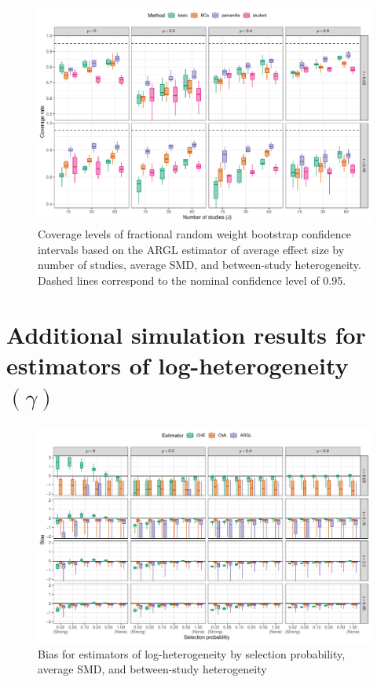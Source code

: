 \documentclass[
  american,
  man, donotrepeattitle,floatsintext]{apa7}
\begin{document}
\begin{figure}
\includegraphics{step-function-selection-models-with-dependent-effects_files/figure-latex/ARGL-coverage-exponential-1} \caption{Coverage levels of fractional random weight bootstrap confidence intervals based on the ARGL estimator of average effect size by number of studies, average SMD, and between-study heterogeneity. Dashed lines correspond to the nominal confidence level of 0.95.}\label{fig:ARGL-coverage-exponential}
\end{figure}

\section{\texorpdfstring{Additional simulation results for estimators of log-heterogeneity \((\gamma)\)}{Additional simulation results for estimators of log-heterogeneity (\textbackslash gamma)}}\label{gamma-simulation-results}

\begin{figure}
\includegraphics{step-function-selection-models-with-dependent-effects_files/figure-latex/heterogeneity-bias-1} \caption{Bias for estimators of log-heterogeneity by selection probability, average SMD, and between-study heterogeneity}\label{fig:heterogeneity-bias}
\end{figure}
\end{document}
